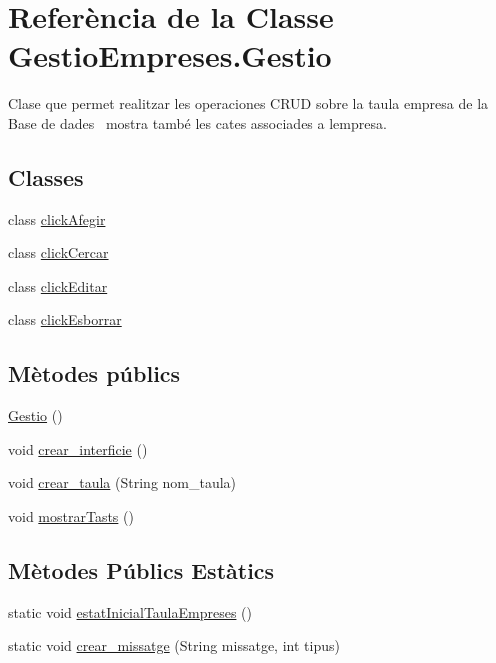 \hypertarget{class_gestio_empreses_1_1_gestio}{}\section{Referència de la Classe Gestio\+Empreses.\+Gestio}
\label{class_gestio_empreses_1_1_gestio}


Clase que permet realitzar les operaciones C\+R\+UD sobre la taula empresa de la Base de dades~\newline
 mostra també les cates associades a l\textquotesingle{}empresa.  


\subsection*{Classes}
\begin{DoxyCompactItemize}
\item 
class \mbox{\hyperlink{class_gestio_empreses_1_1_gestio_1_1click_afegir}{click\+Afegir}}
\item 
class \mbox{\hyperlink{class_gestio_empreses_1_1_gestio_1_1click_cercar}{click\+Cercar}}
\item 
class \mbox{\hyperlink{class_gestio_empreses_1_1_gestio_1_1click_editar}{click\+Editar}}
\item 
class \mbox{\hyperlink{class_gestio_empreses_1_1_gestio_1_1click_esborrar}{click\+Esborrar}}
\end{DoxyCompactItemize}
\subsection*{Mètodes públics}
\begin{DoxyCompactItemize}
\item 
\mbox{\hyperlink{class_gestio_empreses_1_1_gestio_a91ba56ea47931cbd57490803f1d4fe9a}{Gestio}} ()
\item 
void \mbox{\hyperlink{class_gestio_empreses_1_1_gestio_a7e8574e7ebd38ba4e7ad4dc5076c4754}{crear\+\_\+interficie}} ()
\item 
void \mbox{\hyperlink{class_gestio_empreses_1_1_gestio_a172cc64fe5471a5e56a1a631842122ba}{crear\+\_\+taula}} (String nom\+\_\+taula)
\item 
void \mbox{\hyperlink{class_gestio_empreses_1_1_gestio_a0c06f01a8b873ec71a0e35ed57dcc572}{mostrar\+Tasts}} ()
\end{DoxyCompactItemize}
\subsection*{Mètodes Públics Estàtics}
\begin{DoxyCompactItemize}
\item 
static void \mbox{\hyperlink{class_gestio_empreses_1_1_gestio_a24868c8e57f3dc1b25d863a71080af44}{estat\+Inicial\+Taula\+Empreses}} ()
\item 
static void \mbox{\hyperlink{class_gestio_empreses_1_1_gestio_a38fd5f7b16dcdfcf9d6ab5fb2e71e607}{crear\+\_\+missatge}} (String missatge, int tipus)
\end{DoxyCompactItemize}


